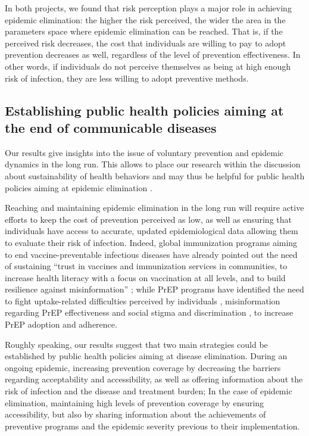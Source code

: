 In both projects, we found that risk perception plays a major role in achieving epidemic elimination: the higher the risk perceived, the wider the area in the parameters space where epidemic elimination can be reached. That is, if the perceived risk decreases, the cost that individuals are willing to pay to adopt prevention decreases as well, regardless of the level of prevention effectiveness. In other words, if individuals do not perceive themselves as being at high enough risk of infection, they are less willing to adopt preventive methods. 

\subsection{Establishing public health policies aiming at the end of communicable diseases}

Our results give insights into the issue of voluntary prevention and epidemic dynamics in the long run. This allows to place our research within the discussion about sustainability of health behaviors and may thus be helpful for public health policies aiming at epidemic elimination \cite[]{SDG_Goal3}.  

Reaching and maintaining epidemic elimination in the long run will require active efforts to keep the cost of prevention perceived as low, as well as ensuring that individuals have access to accurate, updated epidemiological data allowing them to evaluate their risk of infection. Indeed, global immunization programs aiming to end vaccine-preventable infectious diseases have already pointed out the need of sustaining ``trust in vaccines and immunization services in communities, to increase health literacy with a focus on vaccination at all levels, and to build resilience against misinformation'' \cite[]{WHO_IA2030}; while PrEP programs have identified the need to fight uptake-related difficulties perceived by individuals \cite[]{Desai2018,Sidebottom2018}, misinformation regarding PrEP effectiveness \cite[]{Young2014,Underhill2016} and social stigma and discrimination \cite[]{Young2014,PerezFigueroa2015,Arnold2016}, to increase PrEP adoption and adherence.

Roughly speaking, our results suggest that two main strategies could be established by public health policies aiming at disease elimination. During an ongoing epidemic, increasing prevention coverage by decreasing the barriers regarding acceptability and accessibility, as well as offering information about the risk of infection and the disease and treatment burden; In the case of epidemic elimination, maintaining high levels of prevention coverage by ensuring accessibility, but also by sharing information about  the achievements of preventive programs and the epidemic severity previous to their implementation. 

